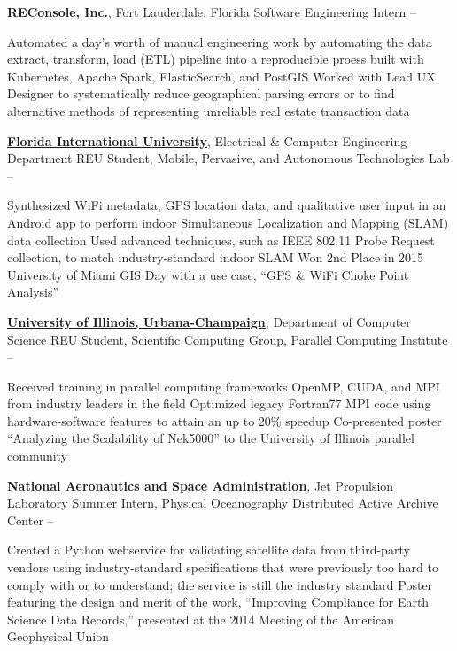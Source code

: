 \documentclass[letterpaper,MMMyyyy,nonstopmode]{simpleresumecv}
\begin{document}
\begin{Body}
\Entry
\textbf{REConsole, Inc.}, Fort Lauderdale, Florida
\Gap
\BulletItem
Software Engineering Intern
\hfill
{} -- 
\begin{Detail}
\SubBulletItem Automated a day's worth of manual engineering work by automating the data extract, transform, load (ETL) pipeline into a reproducible proess built with Kubernetes, Apache Spark, ElasticSearch, and PostGIS
\SubBulletItem Worked with Lead UX Designer to systematically reduce geographical parsing errors or to find alternative methods of representing unreliable real estate transaction data
\end{Detail}

\Entry
\href{http://www.fiu.edu/}{\textbf{Florida International University}}, Electrical \& Computer Engineering Department
\Gap
\BulletItem REU Student, Mobile, Pervasive, and Autonomous Technologies Lab
\hfill {} -- 
\begin{Detail}
\SubBulletItem Synthesized WiFi metadata, GPS location data, and qualitative user input in an Android app to perform indoor Simultaneous Localization and Mapping (SLAM) data collection
\SubBulletItem Used advanced techniques, such as IEEE 802.11 Probe Request collection, to match industry-standard indoor SLAM
\SubBulletItem Won 2nd Place in 2015 University of Miami GIS Day with a use case, ``GPS \& WiFi Choke Point Analysis''
\end{Detail}

\Entry
\href{http://illinois.edu/}{\textbf{University of Illinois, Urbana-Champaign}}, Department of Computer Science
\Gap
\BulletItem REU Student, Scientific Computing Group, Parallel Computing Institute
\hfill {} -- 
\begin{Detail}
\SubBulletItem Received training in parallel computing frameworks OpenMP, CUDA, and MPI from industry leaders in the field
\SubBulletItem Optimized legacy Fortran77 MPI code using hardware-software features to attain an up to 20\% speedup
\SubBulletItem Co-presented poster ``Analyzing the Scalability of Nek5000'' to the University of Illinois parallel community
\end{Detail}

\Entry
\href{http://www.jpl.nasa.gov/}{\textbf{National Aeronautics and Space Administration}}, Jet Propulsion Laboratory
\Gap
\BulletItem Summer Intern, Physical Oceanography Distributed Active Archive Center
\hfill
{} -- 
\begin{Detail}
\SubBulletItem Created a Python webservice for validating satellite data from third-party vendors using industry-standard specifications that were previously too hard to comply with or to understand; the service is still the industry standard
\SubBulletItem Poster featuring the design and merit of the work, ``Improving Compliance for Earth Science Data Records,'' presented at the 2014 Meeting of the American Geophysical Union
\end{Detail}


\end{Body}
\end{document}
